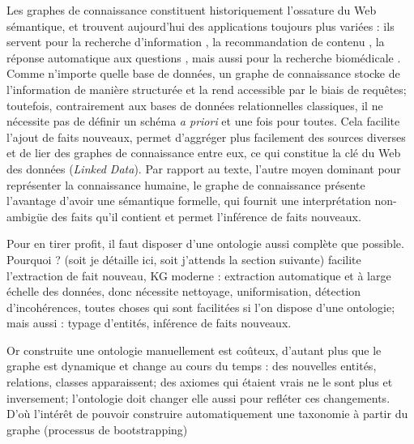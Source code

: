 \label{sec:Introduction}  %

Les graphes de connaissance constituent historiquement l'ossature du Web sémantique, et trouvent aujourd'hui des applications toujours plus variées : ils servent pour la recherche d'information \cite{bounhas2019building, dietz2018utilizing}, la recommandation de contenu \cite{ying2018graph, wang2018ripplenet, wang2019explainable}, la réponse automatique aux questions \cite{zhang2018variational, lukovnikov2017neural, saha2018complex}, mais aussi pour la recherche biomédicale \cite{bakal2018exploiting, sousa2020evolving}. Comme n'importe quelle base de données, un graphe de connaissance stocke de l'information de manière structurée et la rend accessible par le biais de requêtes; toutefois, contrairement aux bases de données relationnelles classiques, il ne nécessite pas de définir un schéma \textit{a priori} et une fois pour toutes. Cela facilite l'ajout de faits nouveaux, permet d'aggréger plus facilement des sources diverses et de lier des graphes de connaissance entre eux, ce qui constitue la clé du Web des données (\textit{Linked Data}).
Par rapport au texte, l'autre moyen dominant pour représenter la connaissance humaine, le graphe de connaissance présente l'avantage d'avoir une sémantique formelle, qui fournit une interprétation non-ambigüe des faits qu'il contient et permet l'inférence de faits nouveaux.

Pour en tirer profit, il faut disposer d'une ontologie aussi complète que possible. Pourquoi ? (soit je détaille ici, soit j'attends la section suivante) facilite l'extraction de fait nouveau, KG moderne : extraction automatique et à large échelle des données, donc nécessite nettoyage, uniformisation, détection d'incohérences, toutes choses qui sont facilitées si l'on dispose d'une ontologie; mais aussi : typage d'entités, inférence de faits nouveaux.

Or construite une ontologie manuellement est coûteux, d'autant plus que le graphe est dynamique et change au cours du temps : des nouvelles entités, relations, classes apparaissent; des axiomes qui étaient vrais ne le sont plus et inversement; l'ontologie doit changer elle aussi pour refléter ces changements. D'où l'intérêt de pouvoir construire automatiquement une taxonomie à partir du graphe (processus de bootstrapping)



